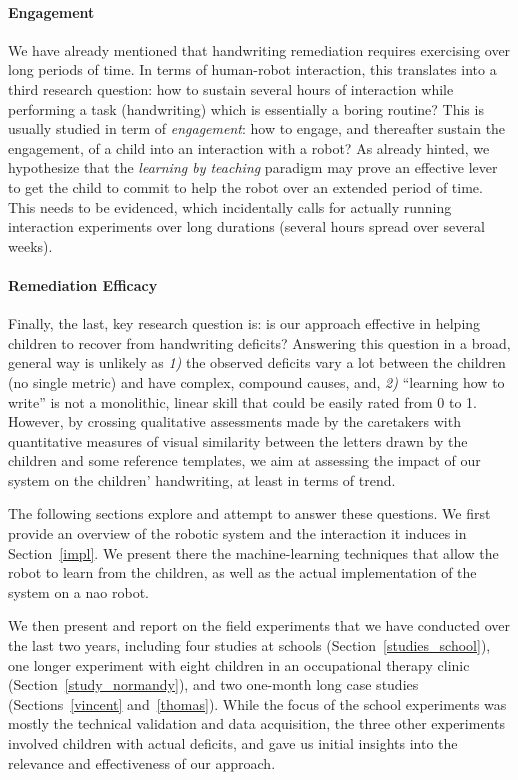 \documentclass{article}
\begin{document}
\paragraph{Engagement} We have already mentioned that handwriting remediation
requires exercising over long periods of time. In terms of human-robot
interaction, this translates into a third research question: how to sustain
several hours of interaction while performing a task (handwriting) which is
essentially a boring routine? This is usually studied in term of
\emph{engagement}: how to engage, and thereafter sustain the engagement, of a
child into an interaction with a robot? As already hinted, we hypothesize that
the \emph{learning by teaching} paradigm may prove an effective lever to get the
child to commit to help the robot over an extended period of time. This needs to
be evidenced, which incidentally calls for actually running interaction
experiments over long durations (several hours spread over several weeks).

\paragraph{Remediation Efficacy} Finally, the last, key research question is: is
our approach effective in helping children to recover from handwriting deficits?
Answering this question in a broad, general way is unlikely as {\it 1)} the
observed deficits vary a lot between the children (no single metric) and have
complex, compound causes, and, {\it 2)} ``learning how to write'' is not a
monolithic, linear skill that could be easily rated from 0 to 1.  However, by
crossing qualitative assessments made by the caretakers with quantitative
measures of visual similarity between the letters drawn by the children and some
reference templates, we aim at assessing the impact of our system on the
children' handwriting, at least in terms of trend.

\vspace{2em}
The following sections explore and attempt to answer these
questions. We first provide an
overview of the robotic system and the interaction it induces
in Section~\ref{impl}. We present there
the machine-learning techniques that allow the robot to learn from the children,
as well as the actual implementation of the system on a {\sc nao} robot.

We then present and report on the field experiments that we have conducted over
the last two years, including four studies at schools
(Section~\ref{studies_school}), one longer experiment with
eight children in an occupational therapy clinic (Section~\ref{study_normandy}), and two one-month
long case studies (Sections~\ref{vincent} and~\ref{thomas}). While the focus of the school experiments was mostly the
technical validation and data acquisition, the three other experiments involved
children with actual deficits, and gave us initial insights into the relevance and
effectiveness of our approach.
\end{document}
